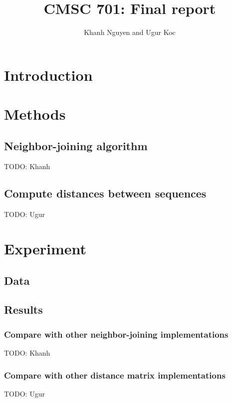 \documentclass[11pt,letterpaper]{article}
\title{
   CMSC 701: Final report
}
\author{
	Khanh Nguyen and Ugur Koc
}
\theoremstyle{definition}
\begin{document}
\maketitle

\section{Introduction}

\section{Methods}
\subsection{Neighbor-joining algorithm}

TODO: Khanh 

\subsection{Compute distances between sequences}

TODO: Ugur

\section{Experiment}
\subsection{Data}


\subsection{Results}
\subsubsection{Compare with other neighbor-joining implementations}

TODO: Khanh 

\subsubsection{Compare with other distance matrix implementations}

TODO: Ugur
\end{document}
